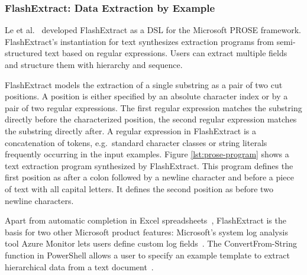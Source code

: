 

\subsubsection{FlashExtract: Data Extraction by Example}
Le et al.~\cite{le2014flashextract:} developed FlashExtract as a DSL for the Microsoft PROSE framework.
FlashExtract's instantiation for text synthesizes extraction programs from semi-structured text based on regular expressions.
Users can extract multiple fields and structure them with hierarchy and sequence.

FlashExtract models the extraction of a single substring as a pair of two cut positions.
A position is either specified by an absolute character index or by a pair of two regular expressions.
The first regular expression matches the substring directly before the characterized position, the second regular expression matches the substring directly after.
A regular expression in FlashExtract is a concatenation of tokens, e.g.\ standard character classes or string literals frequently occurring in the input examples.
Figure \ref{lst:prose-program} shows a text extraction program synthesized by FlashExtract.
This program defines the first position as after a colon followed by a newline character and before a piece of text with all capital letters.
It defines the second position as before two newline characters.

Apart from automatic completion in Excel spreadsheets~\cite{excel2019flashfill}, FlashExtract is the basis for two other Microsoft product features:
Microsoft's system log analysis tool Azure Monitor lets users define custom log fields~\cite{azure2019custom}.
The ConvertFrom-String function in PowerShell allows a user to specify an example template to extract hierarchical data from a text document~\cite{powershell2019convert}.

